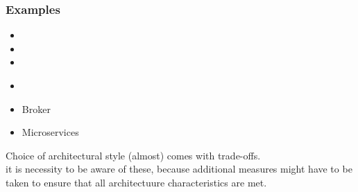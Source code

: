 \subsubsection{Examples}
\begin{defBox}[title=Examples of architectural styles]
    \begin{itemize}
        \item {}
        \item {}
        \item {}
    \end{itemize}
    \begin{itemize}
        \item {}
        \item Broker
        \item Microservices
    \end{itemize}
\end{defBox}
\begin{defBox}[title=Choosing an architectural style]
    Choice of architectural style (almost)  comes with trade-offs.\\
    it is necessity to be aware of these, because additional measures might have to be taken to ensure that all architectuure characteristics are met.
\end{defBox}
